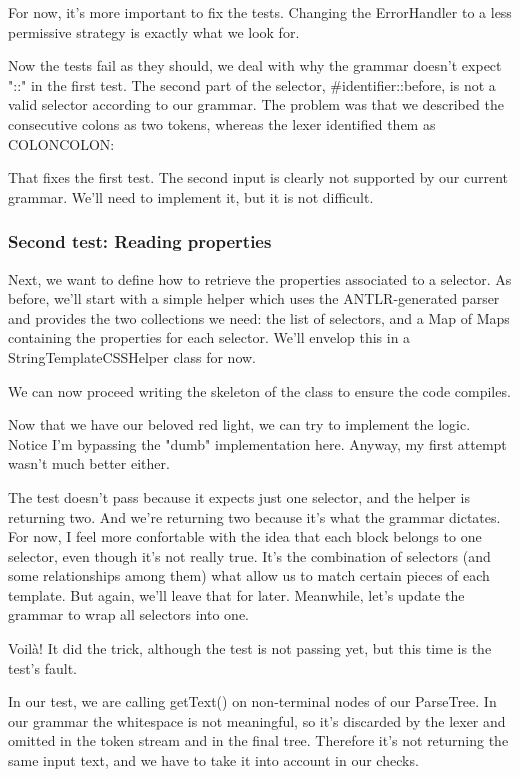 \documentclass[11pt]{article}
\begin{document}
For now, it's more important to fix the tests. Changing the ErrorHandler to a less permissive strategy is exactly what we look for.


Now the tests fail as they should, we deal with why the grammar doesn't expect "::" in the first test. The second part of the selector, \#identifier::before, is not a valid selector according to our grammar.
The problem was that we described the consecutive colons as two tokens, whereas the lexer identified them as COLONCOLON:


That fixes the first test. The second input is clearly not supported by our current grammar. We'll need to implement it, but it is not difficult.

\subsubsection{Second test: Reading properties}
\label{sec-1-4-3}

Next, we want to define how to retrieve the properties associated to a selector. As before, we'll start with a simple helper which uses
the ANTLR-generated parser and provides the two collections we need: the list of selectors, and a Map of Maps containing the properties for each selector.
We'll envelop this in a StringTemplateCSSHelper class for now.


We can now proceed writing the skeleton of the class to ensure the code compiles.


Now that we have our beloved red light, we can try to implement the logic. Notice I'm bypassing the "dumb" implementation here. Anyway, my first attempt wasn't much better either.


The test doesn't pass because it expects just one selector, and the helper is returning two. And we're returning two
because it's what the grammar dictates. For now, I feel more confortable with the idea that each block belongs
to one selector, even though it's not really true. It's the combination of selectors (and some relationships among them) what allow us
to match certain pieces of each template. But again, we'll leave that for later. Meanwhile, let's update the grammar to
wrap all selectors into one.


Voilà! It did the trick, although the test is not passing yet, but this time is the test's fault.


In our test, we are calling getText() on non-terminal nodes of our ParseTree. In our grammar the whitespace is not meaningful, so it's
discarded by the lexer and omitted in the token stream and in the final tree. Therefore it's not returning the same input text, and
we have to take it into account in our checks.
\end{document}
